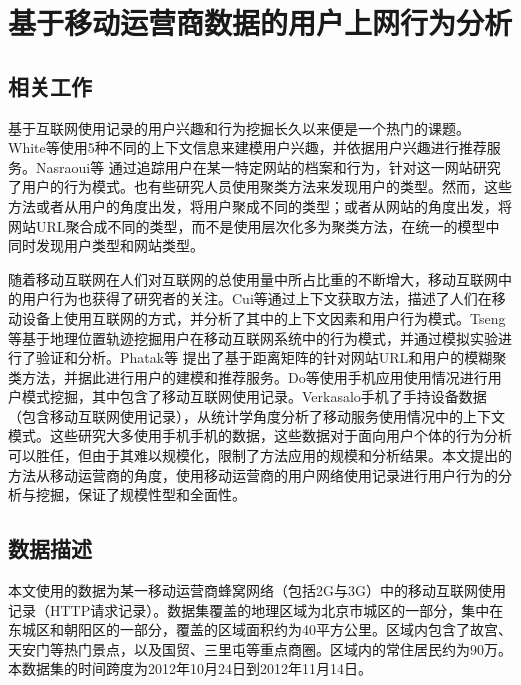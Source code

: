 \chapter{基于移动运营商数据的用户上网行为分析}
\label{cha:interest}




\section{相关工作}
\label{interest:sec:relatedwork}

基于互联网使用记录的用户兴趣和行为挖掘长久以来便是一个热门的课题\cite{kdd00kosala}\cite{kdd00srivastava}\cite{widm01Mobasher}。 White等\cite{sigir09white}使用5种不同的上下文信息来建模用户兴趣，并依据用户兴趣进行推荐服务。Nasraoui等\cite{tkde08nasraoui} 通过追踪用户在某一特定网站的档案和行为，针对这一网站研究了用户的行为模式。也有些研究人员使用聚类方法来发现用户的类型\cite{icina10xu}\cite{kdex99mobasher}。然而，这些方法或者从用户的角度出发，将用户聚成不同的类型；或者从网站的角度出发，将网站URL聚合成不同的类型，而不是使用层次化多为聚类方法，在统一的模型中同时发现用户类型和网站类型。 

随着移动互联网在人们对互联网的总使用量中所占比重的不断增大，移动互联网中的用户行为也获得了研究者的关注\cite{pm2hw2n12almutairi}。Cui等\cite{www08cui}通过上下文获取方法，描述了人们在移动设备上使用互联网的方式，并分析了其中的上下文因素和用户行为模式。Tseng等\cite{ist06tseng}基于地理位置轨迹挖掘用户在移动互联网系统中的行为模式，并通过模拟实验进行了验证和分析。Phatak等\cite{fuzzy02phatak} 提出了基于距离矩阵的针对网站URL和用户的模糊聚类方法，并据此进行用户的建模和推荐服务。Do等\cite{mum10do}使用手机应用使用情况进行用户模式挖掘，其中包含了移动互联网使用记录。Verkasalo\cite{puc09verkasalo}手机了手持设备数据（包含移动互联网使用记录），从统计学角度分析了移动服务使用情况中的上下文模式。这些研究大多使用手机手机的数据，这些数据对于面向用户个体的行为分析可以胜任，但由于其难以规模化，限制了方法应用的规模和分析结果。本文提出的方法从移动运营商的角度，使用移动运营商的用户网络使用记录进行用户行为的分析与挖掘，保证了规模性型和全面性。

\section{数据描述}
\label{interest:sec:data}

本文使用的数据为某一移动运营商蜂窝网络（包括2G与3G）中的移动互联网使用记录（HTTP请求记录）。数据集覆盖的地理区域为北京市城区的一部分，集中在东城区和朝阳区的一部分，覆盖的区域面积约为40平方公里。区域内包含了故宫、天安门等热门景点，以及国贸、三里屯等重点商圈。区域内的常住居民约为90万。本数据集的时间跨度为2012年10月24日到2012年11月14日。

